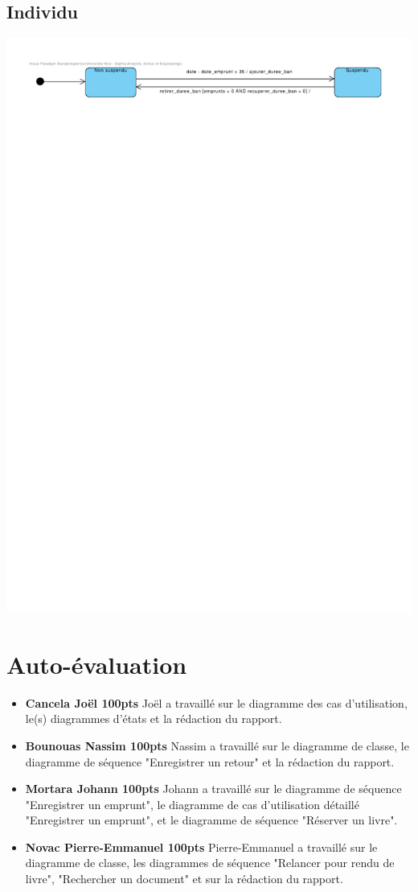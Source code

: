 \documentclass{article}
\begin{document}
\subsection{Individu}
\vspace{-4em}
\hspace*{-9em}\includegraphics[scale=1.5]{state_individu}
\vspace*{-4em}

\section{Auto-évaluation}
\begin{itemize}
	\item \textbf{Cancela Joël 100pts}
		Joël a travaillé sur le diagramme des cas d'utilisation, le(s) diagrammes d'états et la rédaction du rapport.
	\item \textbf{Bounouas Nassim 100pts}
		Nassim a travaillé sur le diagramme de classe, le diagramme de séquence "Enregistrer un retour" et la rédaction du rapport.
	\item \textbf{Mortara Johann 100pts}
		Johann a travaillé sur le diagramme de séquence "Enregistrer un emprunt", le diagramme de cas d'utilisation détaillé "Enregistrer un emprunt", et le diagramme de séquence "Réserver un livre".
	\item \textbf{Novac Pierre-Emmanuel 100pts}
		Pierre-Emmanuel a travaillé sur le diagramme de classe, les diagrammes de séquence "Relancer pour rendu de livre", "Rechercher un document" et sur la rédaction du rapport.
\end{itemize}
\end{document}
